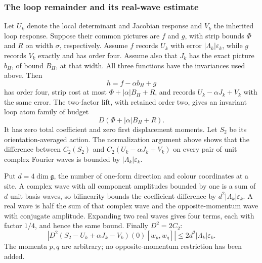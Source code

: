 \subsubsection{The loop remainder and its real-wave estimate}
Let $U_k$ denote the local determinant and Jacobian response and
$V_k$ the inherited loop response. Suppose their common pictures
are $f$ and $g$, with strip bounds $\Phi$ and $R$ on width
$\sigma$, respectively. Assume $f$ records $U_k$ with error
$|\Lambda_k|\varepsilon_k$, while $g$ records $V_k$ exactly and
has order four. Assume also that $J_k$ has the exact picture
$b_H$, of bound $B_H$, at that width. All three functions have
the invariances used above. Then
\[
                h=f-\alpha b_H+g
\]
has order four, strip cost at most $\Phi+|\alpha|B_H+R$,
and records $U_k-\alpha J_k+V_k$ with the same error.
The two-factor lift, with retained order two, gives an invariant
loop atom family of budget
\begin{equation}\label{eq:output-loop-budget}
                          D(\Phi+|\alpha|B_H+R).
\end{equation}
It has zero total coefficient and zero first displacement moments.
Let $S_2$ be its orientation-averaged action. The normalization
argument above shows that the difference between
$C_2(S_2)$ and $C_2(U_k-\alpha J_k+V_k)$ on every pair of unit
complex Fourier waves is bounded by $|\Lambda_k|\varepsilon_k$.

Put $d=4\dim\mathfrak g$, the number of one-form direction and
colour coordinates at a site. A complex wave with all component
amplitudes bounded by one is a sum of $d$ unit basis waves, so
bilinearity bounds the coefficient difference by
$d^2|\Lambda_k|\varepsilon_k$. A real wave is half the sum of
that complex wave and the opposite-momentum wave with conjugate
amplitude. Expanding two real waves gives four terms, each with
factor $1/4$, and hence the same bound. Finally $D^2=2C_2$:
\begin{equation}\label{eq:output-real-wave}
 \left|D^2(S_2-U_k+\alpha J_k-V_k)(0)[w_p,w_q]\right|
        \le 2d^2|\Lambda_k|\varepsilon_k.
\end{equation}
The momenta $p,q$ are arbitrary; no opposite-momentum restriction
has been added.

